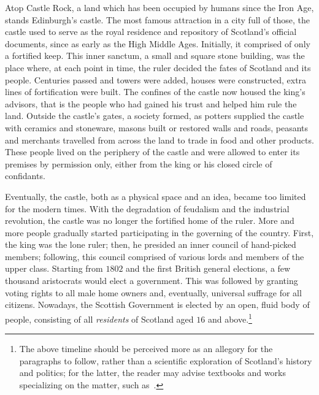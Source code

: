 Atop Castle Rock, a land which has been occupied by humans since the Iron Age,
stands Edinburgh's castle. The most famous attraction in a city full of those,
the castle used to serve as the royal residence and repository of Scotland's
official documents, since as early as the High Middle Ages. Initially, it
comprised of only a fortified keep. This inner sanctum, a small and square
stone building, was the place where, at each point in time, the ruler decided
the fates of Scotland and its people.
Centuries passed and towers were added, houses were
constructed, extra lines of fortification were built. The confines of the
castle now housed the king's advisors, that is the people who had gained his
trust and helped him rule the land. Outside the castle's gates, a society
formed, as potters supplied the castle with ceramics and stoneware,
masons built or restored walls and roads, peasants and merchants travelled from
across the land to trade in food and other products. These people lived on the
periphery of the castle and were allowed to enter its premises by permission
only, either from the king or his closed circle of confidants.

Eventually, the castle, both as a physical space and an idea, became too limited
for the modern times. With the degradation of feudalism
and the industrial revolution, the castle was no longer the fortified home of
the ruler. More and more people gradually started participating in
the governing of the country. First, the king was the lone ruler; then, he
presided an inner council of hand-picked members; following, this council
comprised of various lords and members of the upper class. Starting from
$1802$ and the first British general elections, a few thousand
aristocrats would elect a government. This was followed by
granting voting rights to all male home owners and, eventually, universal
suffrage for all citizens. Nowadays, the Scottish Government is elected by an
open, fluid body of people, consisting of all \emph{residents} of
Scotland aged $16$ and above.\footnote{The above timeline should be perceived
more as an allegory for the paragraphs to follow, rather than a scientific
exploration of Scotland's history and politics; for the latter, the reader may advise
textbooks and works specializing on the matter, such
as~\cite{maclean2019scotland,bambery2014people}.}
